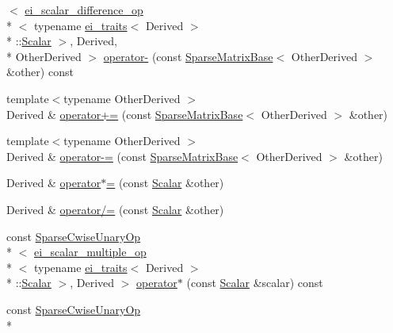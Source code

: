 \begin{DoxyCompactItemize}
$<$ \hyperlink{structei__scalar__difference__op}{ei\-\_\-scalar\-\_\-difference\-\_\-op}\\*
$<$ typename \hyperlink{structei__traits}{ei\-\_\-traits}$<$ Derived $>$\\*
\-::\hyperlink{class_sparse_matrix_base_af39d70f2b7e775e9e17b666cd24128c8}{Scalar} $>$, Derived, \\*
Other\-Derived $>$ \hyperlink{class_sparse_matrix_base_a19a8fc86d02fbd72175de45f500a7ed7}{operator-\/} (const \hyperlink{class_sparse_matrix_base}{Sparse\-Matrix\-Base}$<$ Other\-Derived $>$ \&other) const 
\item 
{\footnotesize template$<$typename Other\-Derived $>$ }\\Derived \& \hyperlink{class_sparse_matrix_base_ad6f1d5b7ffa2a98f6698ef4516071af5}{operator+=} (const \hyperlink{class_sparse_matrix_base}{Sparse\-Matrix\-Base}$<$ Other\-Derived $>$ \&other)
\item 
{\footnotesize template$<$typename Other\-Derived $>$ }\\Derived \& \hyperlink{class_sparse_matrix_base_a78446268084198c3036fd4c54b9c7196}{operator-\/=} (const \hyperlink{class_sparse_matrix_base}{Sparse\-Matrix\-Base}$<$ Other\-Derived $>$ \&other)
\item 
Derived \& \hyperlink{class_sparse_matrix_base_a7b171077f5248b3d16a67ed3eabb1558}{operator$\ast$=} (const \hyperlink{class_sparse_matrix_base_af39d70f2b7e775e9e17b666cd24128c8}{Scalar} \&other)
\item 
Derived \& \hyperlink{class_sparse_matrix_base_ab2f9f019bf768f5fff9c5f08fee30086}{operator/=} (const \hyperlink{class_sparse_matrix_base_af39d70f2b7e775e9e17b666cd24128c8}{Scalar} \&other)
\item 
const \hyperlink{class_sparse_cwise_unary_op}{Sparse\-Cwise\-Unary\-Op}\\*
$<$ \hyperlink{structei__scalar__multiple__op}{ei\-\_\-scalar\-\_\-multiple\-\_\-op}\\*
$<$ typename \hyperlink{structei__traits}{ei\-\_\-traits}$<$ Derived $>$\\*
\-::\hyperlink{class_sparse_matrix_base_af39d70f2b7e775e9e17b666cd24128c8}{Scalar} $>$, Derived $>$ \hyperlink{class_sparse_matrix_base_a68035af7c8d83d528d1a5d3d357d35bf}{operator$\ast$} (const \hyperlink{class_sparse_matrix_base_af39d70f2b7e775e9e17b666cd24128c8}{Scalar} \&scalar) const 
\item 
const \hyperlink{class_sparse_cwise_unary_op}{Sparse\-Cwise\-Unary\-Op}\\*

\end{DoxyCompactItemize}
